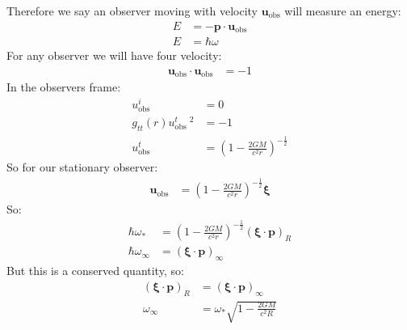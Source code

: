 Therefore we say an observer moving with velocity $\bm{u}_\text{obs}$ will measure an energy:
\begin{align*}
	E &= -\bm{p}\cdot\bm{u}_\text{obs} \\
	E &= \hbar\omega
\end{align*}
For any observer we will have four velocity:
\begin{align*}
	\bm{u}_\text{obs}\cdot\bm{u}_\text{obs} &= -1
\end{align*}
In the observers frame:
\begin{align*}
	u_\text{obs}^i &= 0 \\
	g_{tt}(r) u^t_\text{obs}\ ^2 &= -1 \\
	u^t_\text{obs} &= \left(1- \frac{2GM}{c^2 r}\right)^{-\frac{1}{2}}
\end{align*}
So for our stationary observer:
\begin{align*}
	\bm{u}_\text{obs} &= \left(1- \frac{2GM}{c^2 r}\right)^{-\frac{1}{2}}\bm{\xi}
\end{align*}
So:
\begin{align*}
	\hbar\omega_* &= \left(1- \frac{2GM}{c^2 r}\right)^{-\frac{1}{2}}(\bm{\xi}\cdot\bm{p})_R \\
	\hbar\omega_\infty &= (\bm{\xi}\cdot\bm{p})_\infty
\end{align*}
But this is a conserved quantity, so:
\begin{align*}
	(\bm{\xi}\cdot\bm{p})_R &= (\bm{\xi}\cdot\bm{p})_\infty \\
	\omega_\infty &= \omega_* \sqrt{1 - \frac{2GM}{c^2 R}}
\end{align*}
